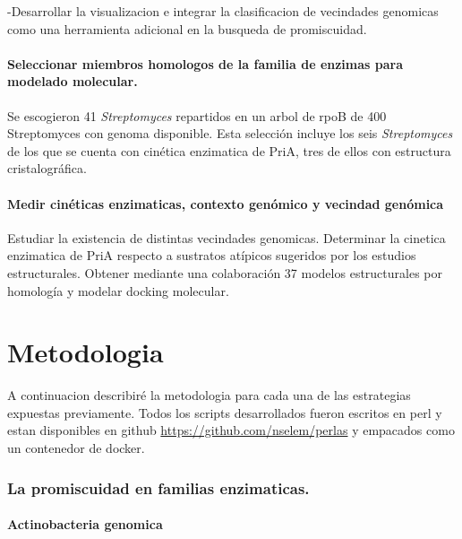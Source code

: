 \documentclass[12pt,twoside]{reedthesis}
\begin{document}
  -Desarrollar la visualizacion e integrar la clasificacion de vecindades
  genomicas como una herramienta adicional en la busqueda de promiscuidad.
  
  \subsubsection{Seleccionar miembros homologos de la familia de enzimas
  para modelado
  molecular.}\label{seleccionar-miembros-homologos-de-la-familia-de-enzimas-para-modelado-molecular.}
  
  Se escogieron 41 \emph{Streptomyces} repartidos en un arbol de rpoB de
  400 Streptomyces con genoma disponible. Esta selección incluye los seis
  \emph{Streptomyces} de los que se cuenta con cinética enzimatica de
  PriA, tres de ellos con estructura cristalográfica.
  
  \subsubsection{Medir cinéticas enzimaticas, contexto genómico y vecindad
  genómica}\label{medir-cineticas-enzimaticas-contexto-genomico-y-vecindad-genomica}
  
  Estudiar la existencia de distintas vecindades genomicas. Determinar la
  cinetica enzimatica de PriA respecto a sustratos atípicos sugeridos por
  los estudios estructurales. Obtener mediante una colaboración 37 modelos
  estructurales por homología y modelar docking molecular.
  
  \clearpage  
  
  \chapter*{Metodologia}\label{metodologia}
  
  A continuacion describiré la metodologia para cada una de las
  estrategias expuestas previamente. Todos los scripts desarrollados
  fueron escritos en perl y estan disponibles en github
  \url{https://github.com/nselem/perlas} y empacados como un contenedor de
  docker.
  
  \subsection{La promiscuidad en familias
  enzimaticas.}\label{la-promiscuidad-en-familias-enzimaticas.-1}
  
  \subsubsection{Actinobacteria genomica}\label{actinobacteria-genomica}
  
\end{document}
